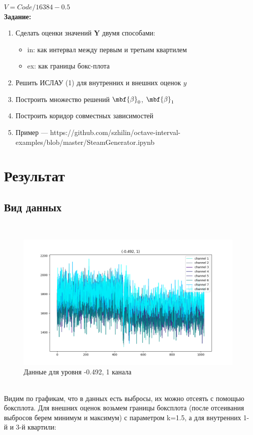\documentclass[a4paper,12pt]{article}
\begin{document}
$V = Code/16384 − 0.5$ \\

\textbf{Задание:}
\begin{enumerate}
    \item Сделать оценки значений $\boldsymbol{Y}$ двумя способами:
        \begin{itemize}
            \item in: как интервал между первым и третьим квартилем
            \item ex: как границы бокс-плота
        \end{itemize}
    \item Решить ИСЛАУ (1) для внутренних и внешних оценок $y$
    \item Построить множество решений $\mbf{\beta}_0$,  $\mbf{\beta}_1$
    \item Построить коридор совместных зависимостей
    \item Пример — https://github.com/szhilin/octave-interval-examples/blob/master/SteamGenerator.ipynb
\end{enumerate}

\newpage
\section{Результат}
\subsection{Вид данных}\\
\begin{figure}[h!]
    \centering
    \includegraphics[width=1\linewidth]{Исходные данные.png}
    \caption{Данные для уровня -0.492, 1 канала}
\end{figure}\\
Видим по графикам, что в данных есть выбросы, их можно отсеять с помощью боксплота. Для внешних оценок возьмем границы боксплота (после отсеивания выбросов берем минимум и максимум) с параметром k=1.5, а для внутренних 1-й и 3-й квартили:
\end{document}
